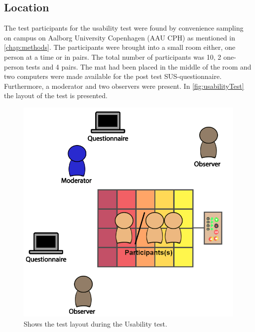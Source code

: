 \subsection{Location}
The test participants for the usability test were found by convenience sampling on campus on Aalborg University Copenhagen (AAU CPH) as mentioned in \autoref{chap:methods}. The participants were brought into a small room either, one person at a time or in pairs. The total number of participants was 10, 2 one-person tests and 4 pairs. The mat had been placed in the middle of the room and two computers were made available for the post test SUS-questionnaire. Furthermore, a moderator and two observers were present. In \autoref{fig:usabilityTest} the layout of the test is presented.

\begin{figure}[H]
	\centering
	\includegraphics[width=0.7\linewidth]{figure/Design/usability}
	\caption{Shows the test layout during the Usability test.}	
	\label{fig:usabilityTest}
\end{figure}

